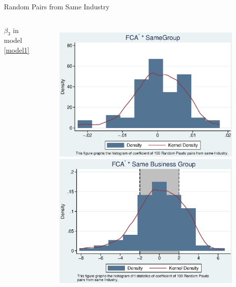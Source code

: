 \documentclass{beamer}
\begin{document}
	
	
	\begin{frame}{Random Pairs from Same Industry}
		
		\begin{columns}\centering
			\column{\textwidth}
			\begin{center}
				$ \beta_3 $ in model \ref{model1}
			\end{center}
			\begin{figure}
				\centering
				\includegraphics[width=0.45\linewidth]{IndustryPseudoSBFCA.eps}
				\includegraphics[width=0.45\linewidth]{IndustryPseudoSBFCA_t.eps}
			\end{figure}
			
			
		\end{columns}
	\end{frame}
	
\end{document}
